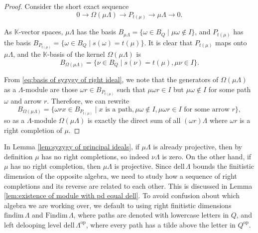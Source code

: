 \documentclass{conm-p-l}
\newcommand{\findim}{\mathrm{findim}\,}
\newcommand{\Findim}{\mathrm{Findim}\,}
\newcommand{\dell}{\mathrm{dell}\,}
\renewcommand{\dell}{\mathrm{dell}\,}
\newcommand{\op}{\mathrm{op}}
\renewcommand{\k}{\mathbb{K}}
\theoremstyle{definition}
\theoremstyle{remark}
\numberwithin{equation}{section}
\begin{document}
\begin{proof}
Consider the short exact sequence
\[
0 \to \Omega(\mu\Lambda) \to P_{t(\mu)} \to \mu\Lambda \to 0.
\]

As $\k$-vector spaces, $\mu\Lambda$ has the basis $B_{\mu\Lambda} = \{\omega\in B_Q \mid \mu\omega\notin I\}$, and $P_{t(\mu)}$ has the basis $B_{P_{t(\mu)}} = \{\omega\in B_Q \mid s(\omega) = t(\mu) \}$. It is clear that $P_{t(\mu)}$ maps onto $\mu\Lambda$, and the $\k$-basis of the kernel $\Omega(\mu\Lambda)$ is
\begin{equation}
\label{eq:basis of syzygy of right ideal}
B_{\Omega(\mu\Lambda)} = \{ \nu\in B_Q \mid s(\nu)=t(\mu), \mu\nu\in I \}.
\end{equation}

From \eqref{eq:basis of syzygy of right ideal}, we note that the generators of $\Omega(\mu\Lambda)$ as a $\Lambda$-module are those $\omega r\in B_{P_{t(\mu)}}$ such that $\mu\omega r\in I$ but $\mu\omega\notin I$ for some path $\omega$ and arrow $r$. Therefore, we can rewrite
\begin{equation}
\label{eq:final basis of syzygy of right ideal}B_{\Omega(\mu\Lambda)} = \{\omega r x\in B_{P_{t(\mu)}} \mid x \text{ is a path}, \mu\omega\notin I, \mu\omega r\in I \text{ for some arrow $r$} \},
\end{equation}
so as a $\Lambda$-module $\Omega(\mu\Lambda)$ is exactly the direct sum of all $(\omega r)\Lambda$ where $\omega r$ is a right completion of $\mu$.
\end{proof}

In Lemma \ref{lem:syzygy of principal ideals}, if $\mu\Lambda$ is already projective, then by definition $\mu$ has no right completions, so indeed $\nu\Lambda$ is zero. On the other hand, if $\mu$ has no right completion, then $\mu\Lambda$ is projective. Since $\dell\Lambda$ bounds the finitistic dimension of the opposite algebra, we need to study how a sequence of right completions and its reverse are related to each other. This is discussed in Lemma \ref{lem:existence of module with pd equal dell}. To avoid confusion about which algebra we are working over, we default to using right finitistic dimensions $\findim\Lambda$ and $\Findim\Lambda$, where paths are denoted with lowercase letters in $Q$, and left delooping level $\dell\Lambda^{\op}$, where every path has a tilde above the letter in $Q^{\op}$.
\end{document}
